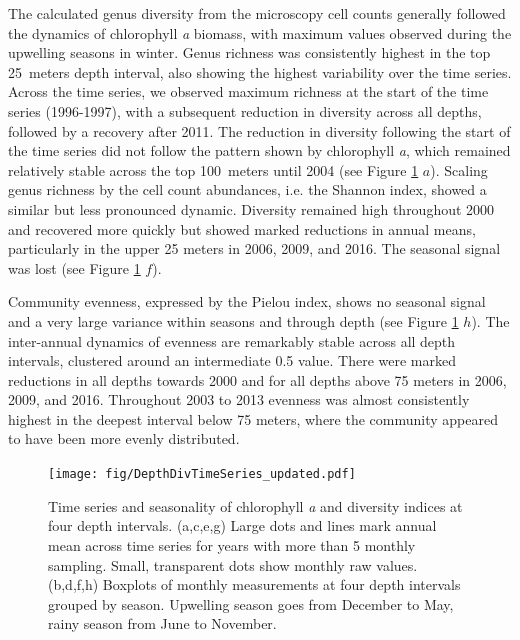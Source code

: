 \documentclass[draft]{agujournal2019}
\begin{document}
    The calculated genus diversity from the microscopy cell counts generally followed the dynamics of chlorophyll \textit{a} biomass, with maximum values observed during the upwelling seasons in winter. Genus richness was consistently highest in the top \qty{25}{meters} depth interval, also showing the highest variability over the time series. Across the time series, we observed maximum richness at the start of the time series (1996-1997), with a subsequent reduction in diversity across all depths, followed by a recovery after 2011. The reduction in diversity following the start of the time series did not follow the pattern shown by chlorophyll \textit{a}, which remained relatively stable across the top \qty{100}{meters} until 2004 (see Figure \ref{fig:divts} $a$). Scaling genus richness by the cell count abundances, i.e. the Shannon index, showed a similar but less pronounced dynamic. Diversity remained high throughout 2000 and recovered more quickly but showed marked reductions in annual means, particularly in the upper 25 meters in 2006, 2009, and 2016. The seasonal signal was lost (see Figure \ref{fig:divts} $f$). 
    
    Community evenness, expressed by the Pielou index, shows no seasonal signal and a very large variance within seasons and through depth (see Figure \ref{fig:divts} $h$). The inter-annual dynamics of evenness are remarkably stable across all depth intervals, clustered around an intermediate 0.5 value. There were marked reductions in all depths towards 2000 and for all depths above 75 meters in 2006, 2009, and 2016. Throughout 2003 to 2013 evenness was almost consistently highest in the deepest interval below 75 meters, where the community appeared to have been more evenly distributed. 
    
    \begin{figure}
    \begin{center}
    \noindent\texttt{[image: fig/DepthDivTimeSeries\_updated.pdf]}
    \end{center}
    \caption{Time series and seasonality of chlorophyll \textit{a} and diversity indices at four depth intervals. (a,c,e,g) Large dots and lines mark annual mean across time series for years with more than 5 monthly sampling. Small, transparent dots show monthly raw values. (b,d,f,h) Boxplots of monthly measurements at four depth intervals grouped by season. Upwelling season goes from December to May, rainy season from June to November.}
    \label{fig:divts}
    \end{figure}
\end{document}
